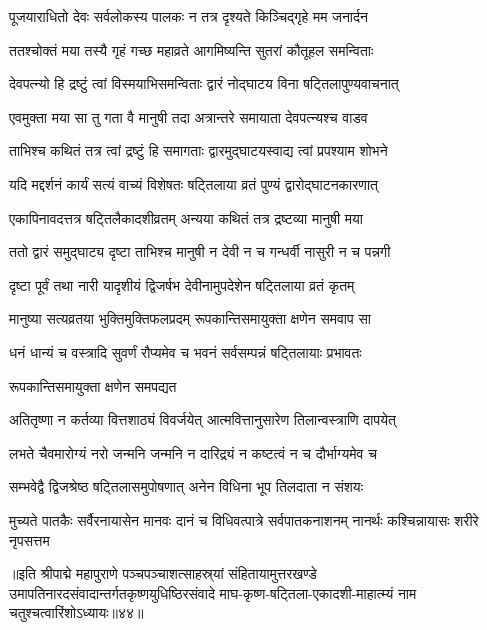 \twolineshloka
{पूजयाराधितो देवः सर्वलोकस्य पालकः}
{न तत्र  दृश्यते किञ्चिद्गृहे मम जनार्दन}%

\twolineshloka
{ततश्चोक्तं मया तस्यै गृहं गच्छ महाव्रते}
{आगमिष्यन्ति सुतरां कौतूहल समन्विताः}%

\twolineshloka
{देवपत्न्यो हि द्रष्टुं त्वां विस्मयाभिसमन्विताः}
{द्वारं नोद्घाटय विना षट्तिलापुण्यवाचनात्}%

\twolineshloka
{एवमुक्ता मया सा तु गता वै मानुषी तदा}
{अत्रान्तरे समायाता देवपत्न्यश्च वाडव}%

\twolineshloka
{ताभिश्च कथितं तत्र त्वां द्रष्टुं हि समागताः}
{द्वारमुद्घाटयस्वाद्य त्वां प्रपश्याम शोभने}%


\twolineshloka
{यदि मद्दर्शनं कार्यं सत्यं वाच्यं विशेषतः}
{षट्तिलाया व्रतं पुण्यं द्वारोद्घाटनकारणात्}%


\twolineshloka
{एकापिनावदत्तत्र षट्तिलैकादशीव्रतम्}
{अन्यया कथितं तत्र द्रष्टव्या मानुषी मया}%

\twolineshloka
{ततो द्वारं समुद्घाट्य दृष्टा ताभिश्च मानुषी}
{न देवी न च गन्धर्वी नासुरी न च पन्नगी}%

\twolineshloka
{दृष्टा पूर्वं तथा नारी यादृशीयं द्विजर्षभ}
{देवीनामुपदेशेन षट्तिलाया व्रतं कृतम्}%

\twolineshloka
{मानुष्या सत्यव्रतया भुक्तिमुक्तिफलप्रदम्}
{रूपकान्तिसमायुक्ता क्षणेन समवाप सा}%

\twolineshloka
{धनं धान्यं च वस्त्रादि सुवर्णं रौप्यमेव च}
{भवनं सर्वसम्पन्नं षट्तिलायाः प्रभावतः}%

\onelineshloka
{रूपकान्तिसमायुक्ता क्षणेन समपद्यत}%

\twolineshloka
{अतितृष्णा न कर्तव्या वित्तशाठ्यं विवर्जयेत्}
{आत्मवित्तानुसारेण तिलान्वस्त्राणि दापयेत्}%

\twolineshloka
{लभते चैवमारोग्यं नरो जन्मनि जन्मनि}
{न दारिद्र्यं न कष्टत्वं न च दौर्भाग्यमेव च}%

\twolineshloka
{सम्भवेद्वै द्विजश्रेष्ठ षट्तिलासमुपोषणात्}
{अनेन विधिना भूप तिलदाता न संशयः}%

\threelineshloka
{मुच्यते पातकैः सर्वैरनायासेन मानवः}
{दानं च विधिवत्पात्रे सर्वपातकनाशनम्}
{नानर्थः कश्चिन्नायासः शरीरे नृपसत्तम}%


॥इति श्रीपाद्मे महापुराणे पञ्चपञ्चाशत्साहस्र्यां संहितायामुत्तरखण्डे उमापतिनारदसंवादान्तर्गतकृष्णयुधिष्ठिरसंवादे माघ-कृष्ण-षट्तिला-एकादशी-माहात्म्यं नाम चतुश्चत्वारिंशोऽध्यायः॥४४॥
\hyperref[sec:ekadashi_mahatmyam_padma_puranam]{\closesub}
\clearpage

